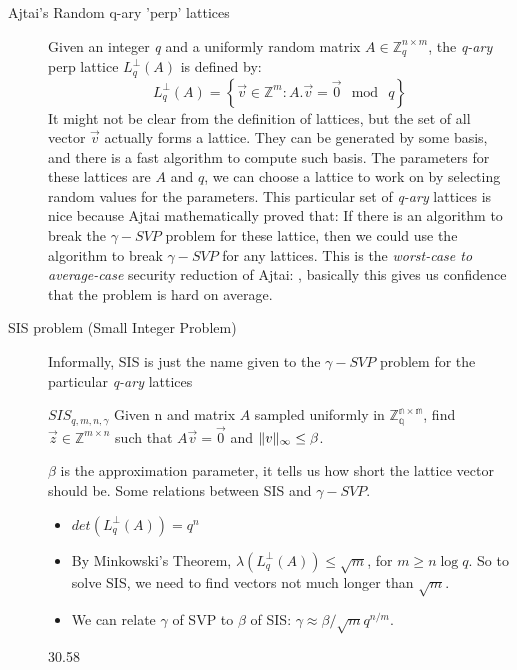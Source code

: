 \begin{description}
    \item[Ajtai's Random q-ary 'perp' lattices] Given an integer \emph{q} and a
        uniformly random matrix $A \in \mathbb{Z}_{q}^{n \times m}$, the
        \emph{q-ary} perp lattice $L_q^\bot(A)$ is defined by:
        \[
            L_q^\bot(A) = \left\{ \vec{v} \in \mathbb{Z}^m : A.\vec{v} =
            \vec{0} \mod \ q \right\}
        \]
        It might not be clear from the definition of lattices, but the set of
        all vector $\vec{v}$ actually forms a lattice. They can be generated by
        some basis, and there is a fast algorithm to compute such basis. The
        parameters for these lattices are $A$ and $q$, we can choose a lattice
        to work on by selecting random values for the parameters. This
        particular set of \emph{q-ary} lattices is nice because Ajtai
        mathematically proved that: If there is an algorithm to break the
        $\gamma-SVP$ problem for these lattice, then we could use the algorithm
        to break $\gamma-SVP$ for any lattices. This is the \emph{worst-case to
        average-case} security reduction of Ajtai: ,
        basically this gives us confidence that the problem is hard on average.
    \item [SIS problem (Small Integer Problem)] Informally, SIS is just the name given to
        the $\gamma-SVP$ problem for the particular \emph{q-ary} lattices
        \begin{definition}
            $SIS_{q,m,n,\gamma}$ Given n and matrix $A$ sampled uniformly in
            $\mathbb{Z_q^{n \times m}}$, find $\vec{z} \in \mathbb{Z}^{m \times
            n}$ such that $A\vec{v} = \vec{0}$ and $\Vert v \Vert_{\infty} \leq \beta$.
            \label{}
        \end{definition}
        $\beta$ is the approximation parameter, it tells us how short the
        lattice vector should be. Some relations between SIS and $\gamma-SVP$.
        \begin{itemize}
            \item $det(L_q^\bot(A)) = q^n$
            \item By Minkowski's Theorem, $\lambda(L_q^\bot(A)) \leq \sqrt{m}$,
                for $m \geq n \log q$. So to solve SIS, we need to find vectors
                not much longer than $\sqrt{m}$.
            \item We can relate $\gamma$ of SVP to $\beta$ of SIS: $\gamma
                \approx \beta/\sqrt{m}q^{n/m}$.
        \end{itemize}30.58


\end{description}
